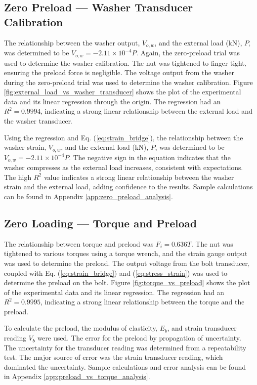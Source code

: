\subsection{Zero Preload --- Washer Transducer Calibration}
The relationship between the washer output, $V_{o, w}$, and the external load (kN), $P$, was determined to be $V_{o, w} = -2.11 \times 10^{-4}P$. Again, the zero-preload trial was used to determine the washer calibration. The nut was tightened to finger tight, ensuring the preload force is negligible. The voltage output from the washer during the zero-preload trial was used to determine the washer calibration. Figure \ref{fig:external_load_vs_washer_transducer} shows the plot of the experimental data and its linear regression through the origin. The regression had an $R^2 = 0.9994$, indicating a strong linear relationship between the external load and the washer transducer.

Using the regression and Eq. (\ref{eq:strain_bridge}), the relationship between the washer strain, $V_{o, w}$, and the external load (kN), $P$, was determined to be $V_{o, w} = -2.11 \times 10^{-4}P$. The negative sign in the equation indicates that the washer compresses as the external load increases, consistent with expectations. The high $R^2$ value indicates a strong linear relationship between the washer strain and the external load, adding confidence to the results. Sample calculations can be found in Appendix \ref{app:zero_preload_analysis}.

\subsection{Zero Loading --- Torque and Preload}
\label{sec:zero_loading_torque_preload}
The relationship between torque and preload was $F_i = 0.636T$. The nut was tightened to various torques using a torque wrench, and the strain gauge output was used to determine the preload. The output voltage from the bolt transducer, coupled with Eq. (\ref{eq:strain_bridge}) and (\ref{eq:stress_strain}) was used to determine the preload on the bolt. Figure \ref{fig:torque_vs_preload} shows the plot of the experimental data and its linear regression. The regression had an $R^2 = 0.9995$, indicating a strong linear relationship between the torque and the preload. 

To calculate the preload, the modulus of elasticity, $E_b$, and strain transducer reading $V_b$ were used. The error for the preload by propagation of uncertainty. The uncertainty for the transducer reading was determined from a repeatability test. The major source of error was the strain transducer reading, which dominated the uncertainty. Sample calculations and error analysis can be found in Appendix \ref{app:preload_vs_torque_analysis}.

